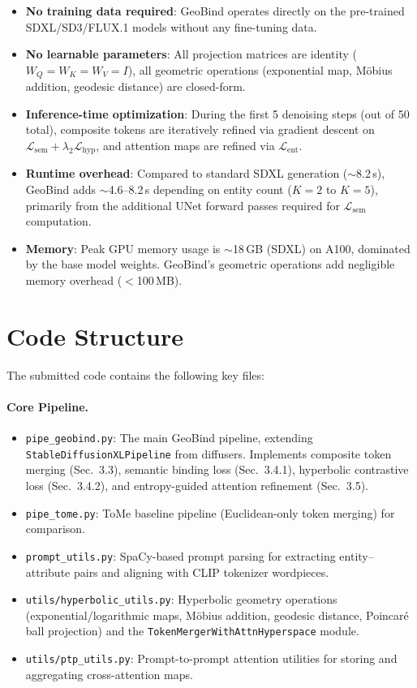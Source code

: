 \documentclass[sigconf,nonacm]{acmart}
\begin{document}
\begin{itemize}
\item \textbf{No training data required}: GeoBind operates directly on the pre-trained SDXL/SD3/FLUX.1 models without any fine-tuning data.
\item \textbf{No learnable parameters}: All projection matrices are identity ($W_Q = W_K = W_V = I$), all geometric operations (exponential map, M\"obius addition, geodesic distance) are closed-form.
\item \textbf{Inference-time optimization}: During the first 5 denoising steps (out of 50 total), composite tokens are iteratively refined via gradient descent on $\mathcal{L}_{\text{sem}} + \lambda_2 \mathcal{L}_{\text{hyp}}$, and attention maps are refined via $\mathcal{L}_{\text{ent}}$.
\item \textbf{Runtime overhead}: Compared to standard SDXL generation ($\sim$8.2\,s), GeoBind adds $\sim$4.6--8.2\,s depending on entity count ($K=2$ to $K=5$), primarily from the additional UNet forward passes required for $\mathcal{L}_{\text{sem}}$ computation.
\item \textbf{Memory}: Peak GPU memory usage is $\sim$18\,GB (SDXL) on A100, dominated by the base model weights. GeoBind's geometric operations add negligible memory overhead ($<$100\,MB).
\end{itemize}

\section{Code Structure}
\label{sec:code}

The submitted code contains the following key files:

\paragraph{Core Pipeline.}
\begin{itemize}
\item \texttt{pipe\_geobind.py}: The main GeoBind pipeline, extending \texttt{StableDiffusionXLPipeline} from diffusers. Implements composite token merging (Sec.~3.3), semantic binding loss (Sec.~3.4.1), hyperbolic contrastive loss (Sec.~3.4.2), and entropy-guided attention refinement (Sec.~3.5).
\item \texttt{pipe\_tome.py}: ToMe baseline pipeline (Euclidean-only token merging) for comparison.
\item \texttt{prompt\_utils.py}: SpaCy-based prompt parsing for extracting entity--attribute pairs and aligning with CLIP tokenizer wordpieces.
\item \texttt{utils/hyperbolic\_utils.py}: Hyperbolic geometry operations (exponential/logarithmic maps, M\"obius addition, geodesic distance, Poincar\'e ball projection) and the \texttt{TokenMergerWithAttnHyperspace} module.
\item \texttt{utils/ptp\_utils.py}: Prompt-to-prompt attention utilities for storing and aggregating cross-attention maps.
\end{itemize}
\end{document}
